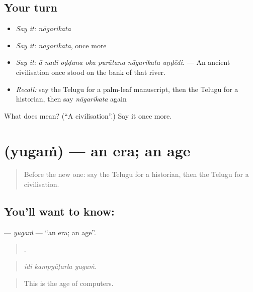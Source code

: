 \subsection*{Your turn}
\begin{itemize}
\raggedright
  \item \emph{Say it:} \emph{nāgarikata}
  \item \emph{Say it:} \emph{nāgarikata}, once more
  \item \emph{Say it:} \emph{ā nadi oḍḍuna oka purātana nāgarikata uṇḍēdi.} — An ancient civilisation once stood on the bank of that river.
  \item \emph{Recall:} say the Telugu for a palm-leaf manuscript, then the Telugu for a historian, then say \emph{nāgarikata} again
\end{itemize}

\begin{tcolorbox}[breakable,colback=teal!4,colframe=teal!35!black,title={Before you move on}]
What does  mean? (\textquotedblleft{}A civilisation\textquotedblright{}.) Say it once more.
\end{tcolorbox}
\section[\texorpdfstring{\te{యుగం} (yugaṁ)}{యుగం (yugaṁ)}]{ (yugaṁ) — an era; an age}

\label{lesson:TE-C368-yugam}



\begin{quote}
Before the new one: say the Telugu for a historian, then the Telugu for a civilisation.
\end{quote}

\subsection*{You'll want to know: }
\textbf{} — \emph{yugaṁ} — \textquotedblleft{}an era; an age\textquotedblright{}.

\begin{quote}
  .
\end{quote}

\begin{quote}
\emph{idi kampyūṭarla yugaṁ.}
\end{quote}

\begin{quote}
This is the age of computers.
\end{quote}

